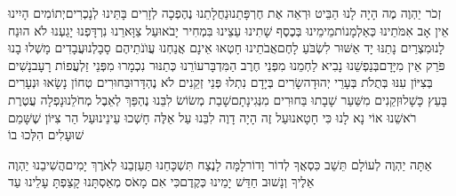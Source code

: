 \documentclass[../main/main.tex]{subfiles}
\begin{document}
\begin{multicols}{\ncols}
זְכֹר יַהְוֶה מֶה הָיָה לָנוּ הַבֵּיט וּרְאֵה אֶת חֶרְפָּתֵנוּ\PreVerseSpace{}נַחֲלָתֵנוּ נֶהֶפְכָה לְזָרִים בָּתֵּינוּ לְנָכְרִים\PreVerseSpace{}יְתוֹמִים הָיִינוּ אֵין אָב אִמֹּתֵינוּ כְּאַלְמָנוֹת\PreVerseSpace{}מֵימֵינוּ בְּכֶסֶף שָׁתִינוּ עֵצֵינוּ בִּמְחִיר יָבֹאוּ\PreVerseSpace{}עַל צַוָּארֵנוּ נִרְדָּפְנוּ יָגַעְנוּ לֹא הוּנַח לָנוּ\PreVerseSpace{}מִצְרַיִם נָתַנּוּ יָד אַשּׁוּר לִשְׂבֹּעַ לָחֶם\PreVerseSpace{}אֲבֹתֵינוּ חָטְאוּ אֵינָם אֲנַחְנוּ עֲוֺנֹתֵיהֶם סָבָלְנוּ\PreVerseSpace{}עֲבָדִים מָשְׁלוּ בָנוּ פֹּרֵק אֵין מִיָּדָם\PreVerseSpace{}בְּנַפְשֵׁנוּ נָבִיא לַחְמֵנוּ מִפְּנֵי חֶרֶב הַמִּדְבָּר\PreVerseSpace{}עוֹרֵנוּ כְּתַנּוּר נִכְמָרוּ מִפְּנֵי זַלְעֲפוֹת רָעָב\PreVerseSpace{}נָשִׁים בְּצִיּוֹן עִנּוּ בְּתֻלֹת בְּעָרֵי יְהוּדָה\PreVerseSpace{}שָׂרִים בְּיָדָם נִתְלוּ פְּנֵי זְקֵנִים לֹא נֶהְדָּרוּ\PreVerseSpace{}בַּחוּרִים טְחוֹן נָשָׂאוּ וּנְעָרִים בָּעֵץ כָּשָׁלוּ\PreVerseSpace{}זְקֵנִים מִשַּׁעַר שָׁבָתוּ בַּחוּרִים מִנְּגִינָתָם\PreVerseSpace{}שָׁבַת מְשׂוֹשׂ לִבֵּנוּ נֶהְפַּךְ לְאֵבֶל מְחֹלֵנוּ\PreVerseSpace{}נָפְלָה עֲטֶרֶת רֹאשֵׁנוּ אוֹי נָא לָנוּ כִּי חָטָאנוּ\PreVerseSpace{}עַל זֶה הָיָה דָוֶה לִבֵּנוּ עַל אֵלֶּה חָשְׁכוּ עֵינֵינוּ\PreVerseSpace{}עַל הַר צִיּוֹן שֶׁשָּׁמֵם שׁוּעָלִים הִלְּכוּ בוֹ\OpenSection{}\par
{}אַתָּה יַהְוֶה לְעוֹלָם תֵּשֵׁב כִּסְאֲךָ לְדוֹר וָדוֹר\PreVerseSpace{}לָמָּה לָנֶצַח תִּשְׁכָּחֵנוּ תַּעַזְבֵנוּ לְאֹרֶךְ יָמִים\PreVerseSpace{}הֲשִׁיבֵנוּ יַהְוֶה אֵלֶיךָ וְנָשׁוּב חַדֵּשׁ יָמֵינוּ כְּקֶדֶם\PreVerseSpace{}כִּי אִם מָאֹס מְאַסְתָּנוּ קָצַפְתָּ עָלֵינוּ עַד\par
\pagebreak
\end{multicols}
\end{document}
